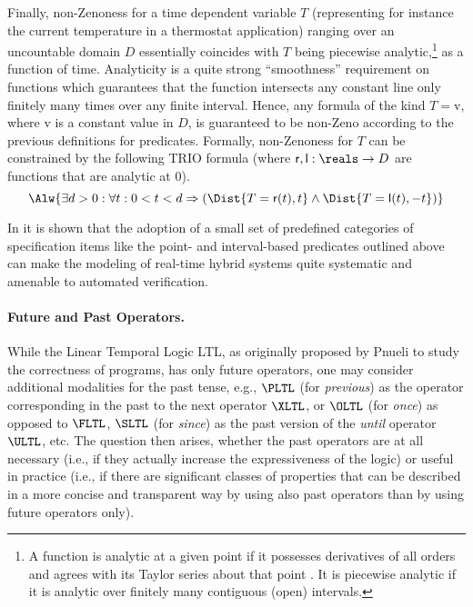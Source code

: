 Finally, non-Zenoness for a time dependent variable $T$ (representing
for instance the current temperature in a thermostat application)
ranging over an uncountable domain $D$ essentially coincides with $T$
being piecewise analytic,\footnote{A function is analytic at a given
  point if it possesses derivatives of all orders and agrees with its
  Taylor series about that point \cite{WeiA,Kno96}. It is piecewise
  analytic if it is analytic over finitely many contiguous (open)
  intervals.} as a function of time. Analyticity is a quite strong
``smoothness'' requirement on functions which guarantees that the
function intersects any constant line only finitely many times over
any finite interval. Hence, any formula of the kind $T = \mathrm{v}$,
where $\mathrm{v}$ is a constant value in $D$, is guaranteed to be
non-Zeno according to the previous definitions for
predicates. Formally, non-Zenoness for $T$ can be constrained by the
following TRIO formula (where $\mathsf{r}, \mathsf{l}: \reals \rightarrow D$ are functions
that are analytic at 0).
\begin{equation*}
  \Alw{\exists d > 0: \forall t: 0 < t < d \Rightarrow \left( \Dist{T = \mathsf{r}(t), t} \wedge \Dist{T = \mathsf{l}(t), -t} \right)}
\end{equation*} 

In \cite{GM06} it is shown that the adoption of a small set of predefined 
categories of specification items like the point- and interval-based 
predicates outlined above can make the modeling of real-time 
hybrid systems quite systematic and amenable to automated verification.


\paragraph{Future and Past Operators.}
While the Linear Temporal Logic LTL, as originally proposed by 
Pnueli \cite{Pnu77} to study the correctness of programs, has only 
future operators, one may consider additional modalities for the 
past tense, e.g., $\PLTL$ (for \emph{previous}) as the operator corresponding 
in the past to the next operator $\XLTL$, or $\OLTL$ (for \emph{once}) 
as opposed to $\FLTL$, $\SLTL$ (for \emph{since}) as the past version 
of the \emph{until} operator $\ULTL$, etc. The question then arises, 
whether the past operators are at all necessary (i.e., if they 
actually increase the expressiveness of the logic) or useful 
in practice (i.e., if there are significant classes of properties 
that can be described in a more concise and transparent way by 
using also past operators than by using future operators only).

